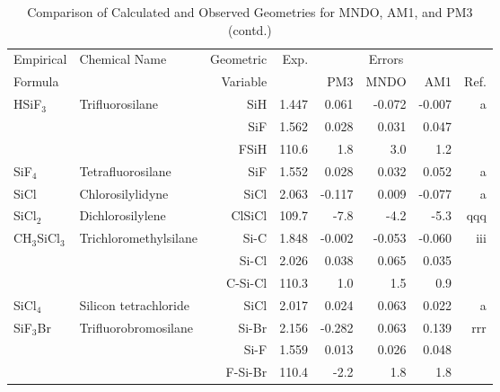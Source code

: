 \begin{table}
\caption{\label{geotabp}Comparison of Calculated and Observed Geometries for 
MNDO, AM1, and PM3 (contd.)}
\begin{center}
\compresstable
\begin{tabular}{llrrrrrr}
 Empirical  & Chemical Name &  Geometric &  Exp. & \multicolumn{3}{c}{Errors} & \\
  Formula   &               &  Variable &        & PM3  & MNDO  &  AM1 & Ref.\\
\hline
 HSiF$_3$       & Trifluorosilane                    &SiH            &     1.447   &     0.061 &    -0.072 &    -0.007 &     a \\
             &                                    &SiF            &     1.562   &     0.028 &     0.031 &     0.047 &       \\
             &                                    &FSiH         &     110.6   &       1.8 &       3.0 &       1.2   &       \\
 SiF$_4$        & Tetrafluorosilane                  &SiF            &     1.552   &     0.028 &     0.032 &     0.052 &     a \\
 SiCl        & Chlorosilylidyne                   &SiCl           &     2.063   &    -0.117 &     0.009 &    -0.077 &     a \\
 SiCl$_2$       & Dichlorosilylene                   &ClSiCl       &     109.7   &      -7.8 &      -4.2 &      -5.3   &   qqq \\
 CH$_3$SiCl$_3$    & Trichloromethylsilane              &Si-C           &     1.848   &    -0.002 &    -0.053 &    -0.060 &   iii \\
             &                                    &Si-Cl          &     2.026   &     0.038 &     0.065 &     0.035 &       \\
             &                                    &C-Si-Cl      &     110.3   &       1.0 &       1.5 &       0.9   &       \\
 SiCl$_4$       & Silicon tetrachloride              &SiCl           &     2.017   &     0.024 &     0.063 &     0.022 &     a \\
 SiF$_3$Br      & Trifluorobromosilane               &Si-Br          &     2.156   &    -0.282 &     0.063 &     0.139 &   rrr \\
             &                                    &Si-F           &     1.559   &     0.013 &     0.026 &     0.048 &       \\
             &                                    &F-Si-Br      &     110.4   &      -2.2 &       1.8 &       1.8   &       \\

\end{tabular}
\end{center}
\end{table}
